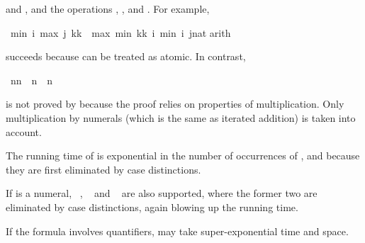 \begin{isabellebody}
\begin{isamarkuptext}
 and , and the operations , ,
 and .  For example,%
\end{isamarkuptext}%
\isamarkuptrue%
\isamarkupfalse%
\ {}min\ i\ {}max\ j\ {}k{}k{}{}\ {}\ max\ {}min\ {}k{}k{}\ i{}\ {}min\ i\ {}j{}{}nat{}{}{}\isanewline
%
\isadelimproof
%
\endisadelimproof
%
\isatagproof
{}\isamarkupfalse%
{}arith{}%
\endisatagproof
{\isafoldproof}%
%
\isadelimproof
%
\endisadelimproof
%
\begin{isamarkuptext}%
\noindent
succeeds because  can be treated as atomic. In contrast,%
\end{isamarkuptext}%
\isamarkuptrue%
\isamarkupfalse%
\ {}n{}n\ {}\ n{}{}\ {}\ n{}{}{}%
\isadelimproof
%
\endisadelimproof
%
\isatagproof
%
\endisatagproof
{\isafoldproof}%
%
\isadelimproof
%
\endisadelimproof
%
\begin{isamarkuptext}%
\noindent
is not proved by  because the proof relies 
on properties of multiplication. Only multiplication by numerals (which is
the same as iterated addition) is taken into account.

\begin{warn} The running time of  is exponential in the number
  of occurrences of ,  and
   because they are first eliminated by case distinctions.

If  is a numeral, ~, ~ and
~ are also supported, where the former two are eliminated
by case distinctions, again blowing up the running time.

If the formula involves quantifiers,  may take
super-exponential time and space.
\end{warn}%
\end{isamarkuptext}%
\isamarkuptrue%
%
\isadelimtheory
%
\endisadelimtheory
%
\isatagtheory
%
\endisatagtheory
{\isafoldtheory}%
%
\isadelimtheory
%
\endisadelimtheory
\end{isabellebody}%
